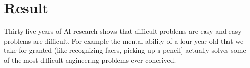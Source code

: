 \documentclass[10pt,a4paper,twoside]{article}
\begin{document}
\section{Result}
Thirty-five years of AI research shows that difficult problems are easy and easy problems are difficult. For example the mental ability of a four-year-old that we take for granted (like recognizing faces, picking up a pencil) actually solves some of the most difficult engineering problems ever conceived.
\end{document}
